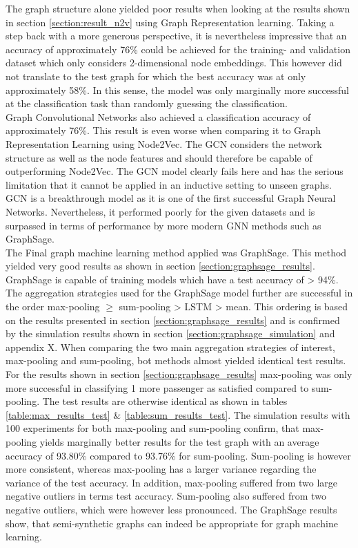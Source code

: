   \noindent The graph structure alone yielded poor results when looking at the 
  results shown in section \ref{section:result_n2v} using Graph Representation 
  learning. Taking a step back with a more generous perspective, it is 
  nevertheless impressive that an accuracy of approximately 76\% could be 
  achieved for the training- and validation dataset which only considers 
  2-dimensional node embeddings. This however did not translate to the test 
  graph for which the best accuracy was at only approximately 58\%. In this 
  sense, the model was only marginally more successful at the classification 
  task than randomly guessing the classification. \\

  \noindent Graph Convolutional Networks also achieved a classification 
  accuracy of approximately 76\%. This result is even worse when comparing it
  to Graph Representation Learning using Node2Vec. The GCN considers the
  network structure as well as the node features and should therefore be
  capable of outperforming Node2Vec. The GCN model clearly fails here and has
  the serious limitation that it cannot be applied in an inductive setting to
  unseen graphs. GCN is a breakthrough model as it is one of the first
  successful Graph Neural Networks. Nevertheless, it performed poorly for the
  given datasets and is surpassed in terms of performance by more modern GNN
  methods such as GraphSage. \\

  \noindent The Final graph machine learning method applied was GraphSage. This
  method yielded very good results as shown in section
  \ref{section:graphsage_results}. GraphSage is capable of training models
  which have a test accuracy of > 94\%. The aggregation strategies used for the
  GraphSage model further are successful in the order max-pooling $\geqslant$ 
  sum-pooling > LSTM > mean. This ordering is based on the results presented in 
  section \ref{section:graphsage_results} and is confirmed by the simulation 
  results shown in section \ref{section:graphsage_simulation} and appendix X. 
  When comparing the two main aggregation strategies of interest, max-pooling 
  and sum-pooling, bot methods almost yielded identical test results. For the
  results shown in section \ref{section:graphsage_results} max-pooling was only 
  more successful in classifying 1 more passenger as satisfied compared to
  sum-pooling. The test results are otherwise identical as shown in tables 
  \ref{table:max_results_test} \& \ref{table:sum_results_test}. The simulation
  results with 100 experiments for both max-pooling and sum-pooling confirm,
  that max-pooling yields marginally better results for the test graph with an
  average accuracy of 93.80\% compared to 93.76\% for sum-pooling. Sum-pooling
  is however more consistent, whereas max-pooling has a larger variance
  regarding the variance of the test accuracy. In addition, max-pooling
  suffered from two large negative outliers in terms test accuracy. Sum-pooling
  also suffered from two negative outliers, which were however less pronounced.
  The GraphSage results show, that semi-synthetic graphs can indeed be
  appropriate for graph machine learning.

